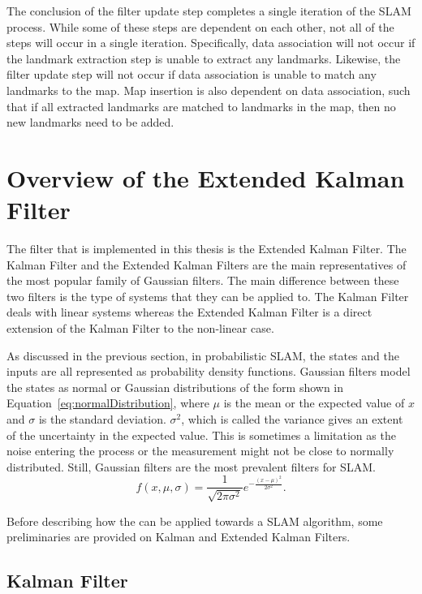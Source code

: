 The conclusion of the filter update step completes a single iteration of the SLAM process. While some of these steps are dependent on each other, not all of the steps will occur in a single iteration. Specifically, data association will not occur if the landmark extraction step is unable to extract any landmarks. Likewise, the filter update step will not occur if data association is unable to match any landmarks to the map. Map insertion is also dependent on data association, such that if all extracted landmarks are matched to landmarks in the map, then no new landmarks need to be added. 

\section{Overview of the Extended Kalman Filter}

The filter that is implemented in this thesis is the Extended Kalman Filter. The Kalman Filter and  the  Extended Kalman Filters are  the  main representatives  of  the most popular family of Gaussian filters. The main difference between these two filters is  the type of systems that they can be applied to.  The  Kalman Filter deals with linear systems whereas the Extended Kalman Filter is a direct extension of the Kalman Filter to the non-linear case.

As discussed in the previous section, in probabilistic SLAM, the states and the inputs are all represented as probability density functions. Gaussian filters model the states as normal or Gaussian distributions of the form shown in Equation~\ref{eq:normalDistribution}, where $ \mu $ is the mean or the expected value of $ x $ and $ \sigma $ is the standard deviation. $ \sigma^2 $, which is called the variance gives an extent of the uncertainty in the expected value. This is sometimes a limitation as the noise entering the process or the measurement might not be close to normally distributed. Still, Gaussian filters are the most prevalent filters for SLAM. 
\begin{equation}
f(x, \mu, \sigma) = \frac{1}{\sqrt{2\pi\sigma^2} } e^{ -\frac{(x-\mu)^2}{2\sigma^2} }.
\label{eq:normalDistribution}
\end{equation}

Before describing how the \ekf can be applied towards a SLAM  algorithm,  some preliminaries are provided on Kalman and Extended Kalman Filters.

\subsection{Kalman Filter}
\label{sec:KalmanFilter}

